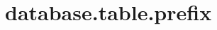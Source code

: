 \section{database.table.prefix}
\label{configuration:DatabaseTablePrefix}
\AvailableInJavaOnly{\TODO}